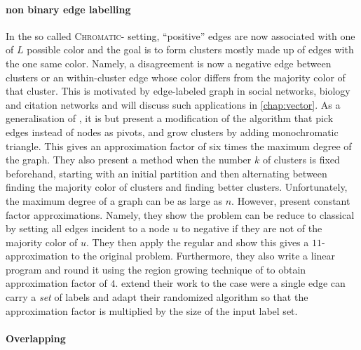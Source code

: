 \paragraph{non binary edge labelling}

In the so called \textsc{Chromatic}-\pcc{} setting, \enquote{positive} edges are now associated with
one of $L$ possible color and the goal is to form clusters mostly made up of edges with the one same
color. Namely, a disagreement is now a negative edge between clusters or an within-cluster edge
whose color differs from the majority color of that cluster. This is motivated by edge-labeled graph
in social networks, biology and citation networks and will discuss such applications in
\autoref{chap:vector}. As a generalisation of \pcc{}, it is \NPc{} but \textcite{Bonchi2012a}
present a modification of the \ccpivot{} algorithm that pick edges instead of nodes as pivots, and
grow clusters by adding monochromatic triangle. This gives an approximation factor of six times the
maximum degree of the graph. They also present a method when the number $k$ of clusters is fixed
beforehand, starting with an initial partition and then alternating between finding the majority
color of clusters and finding better clusters. Unfortunately, the maximum degree of a graph can be
as large as $n$. However, \textcite{Anava2015} present constant factor approximations. Namely, they
show the problem can be reduce to classical \pcc{} by setting all edges incident to a node $u$ to
negative if they are not of the majority color of $u$. They then apply the regular \ccpivot{} and
show this gives a $11$-approximation to the original problem. Furthermore, they also write a linear
program and round it using the region growing technique of \textcite{Charikar2003} to obtain
approximation factor of $4$. \Textcite{multiChromatic15} extend their work to the case were a single
edge can carry a \emph{set} of labels and adapt their randomized algorithm so that the approximation
factor is multiplied by the size of the input label set.


\paragraph{Overlapping \pcc{}}

